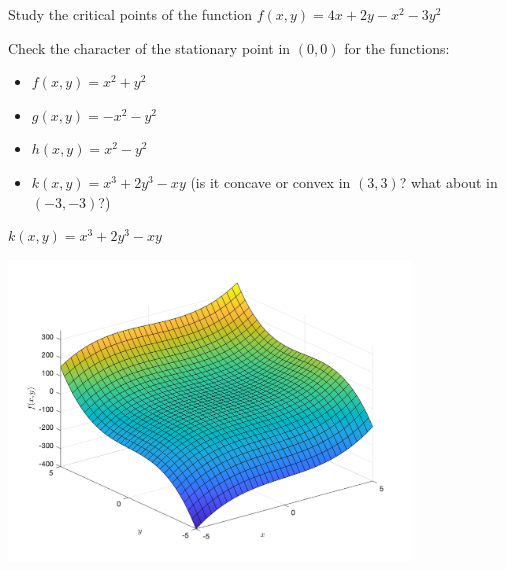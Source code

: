 \documentclass[c]{beamer}
\begin{document}
\begin{frame}
\begin{Exercise}
  Study the critical points of the function $f(x,y)=4x+2y-x^2-3y^2$
\end{Exercise}


\begin{Exercise}
    Check the character of the stationary point in $(0,0)$ for the functions:
    \begin{itemize}
      \item $f(x,y)=x^2+y^2$
      \item $g(x,y)=-x^2-y^2$
      \item $h(x,y)=x^2-y^2$
      \item $k(x,y)=x^3+2y^3-xy$ (is it concave or convex in $(3,3)$? what about in $(-3,-3)$?)
    \end{itemize}

\end{Exercise}

\end{frame}

\begin{frame}{$k(x,y)=x^3+2y^3-xy$}
  \begin{center}
    \includegraphics[width=0.8\textwidth]{../figures/x3plus2y3minusxy.png}
  \end{center}
\end{frame}
\end{document}
